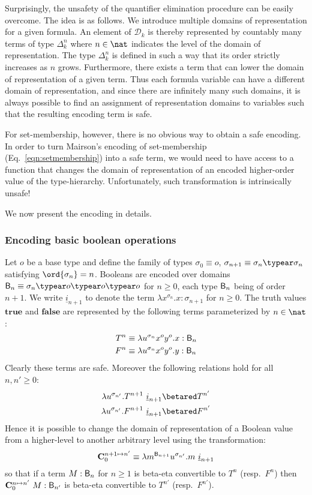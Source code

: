Surprisingly, the unsafety of the quantifier elimination procedure can be easily overcome. The idea is as follows. We introduce multiple domains of representation for a given formula. An element of $\mathcal{D}_k$ is thereby represented by countably many terms of type $\Delta_k^n$ where $n\in\nat$ indicates the level of the domain of representation. The type $\Delta_k^n$ is defined in such a way that its order strictly increases as $n$ grows. Furthermore, there exists a term that can lower the domain of representation of a given term. Thus each formula variable can have a different domain of representation, and since there are infinitely many such domains, it is always possible to find an assignment of representation domains to variables such that the resulting encoding term is safe.

For set-membership, however, there is no obvious way to obtain a safe encoding. In order to turn Mairson's encoding of set-membership (Eq.\ \ref{eqn:setmembership}) into a safe term, we would need to have access to a function that changes the domain of representation of an encoded higher-order value of the type-hierarchy. Unfortunately, such transformation is intrinsically unsafe!
\smallskip

We now present the encoding in details.

\subsubsection{Encoding basic boolean operations}

Let $o$ be a base type and define the family of types $\sigma_0
\equiv o$, $\sigma_{n+1} \equiv \sigma_n\typear\sigma_n$ satisfying
$\ord{\sigma_n} = n$. Booleans are encoded over domains $\booltype_n
\equiv \sigma_n\typear o\typear o\typear o$ for $n\geq0$, each type
$\mathsf{B}_n$ being of order $n+1$. We write $\underline{i}_{n+1}$
to denote the term $\lambda x^{\sigma_n}.x : \sigma_{n+1}$ for
$n\geq0$. The truth values $\mathbf{true}$ and $\mathbf{false}$ are
represented by the following terms parameterized by $n \in \nat$:
\begin{align*}
  T^n &\equiv \lambda u^{\sigma_n} x^o y^o .x : \mathsf{B}_{n}\\
  F^n &\equiv \lambda u^{\sigma_n} x^o y^o .y : \mathsf{B}_{n}
\end{align*}
Clearly these terms are safe. Moreover the following relations hold
for all $n,n'\geq 0$:
\begin{align*}
  \lambda u^{\sigma_{n'}} . T^{n+1}~\underline{i}_{n+1}  &\betared  T^{n'} \\
  \lambda u^{\sigma_{n'}} . F^{n+1}~\underline{i}_{n+1}  &\betared  F^{n'}
\end{align*}
Hence it is possible to change the domain of representation of a Boolean value from a higher-level to another arbitrary level using the transformation:
$$ \mathbf{C}^{n+1\mapsto n'}_0 \equiv \lambda m^{\mathsf{B}_{n+1}} u^{\sigma_{n'}}. m~\underline{i}_{n+1}$$
so that if a term $M : \mathsf{B}_n$ for $n\geq1$ is beta-eta convertible to $T^n$ (resp.\ $F^n$) then $\mathbf{C}^{n\mapsto n'}_0~M :\mathsf{B}_{n'}$ is beta-eta convertible to $T^{n'}$ (resp.\ $F^{n'}$).

